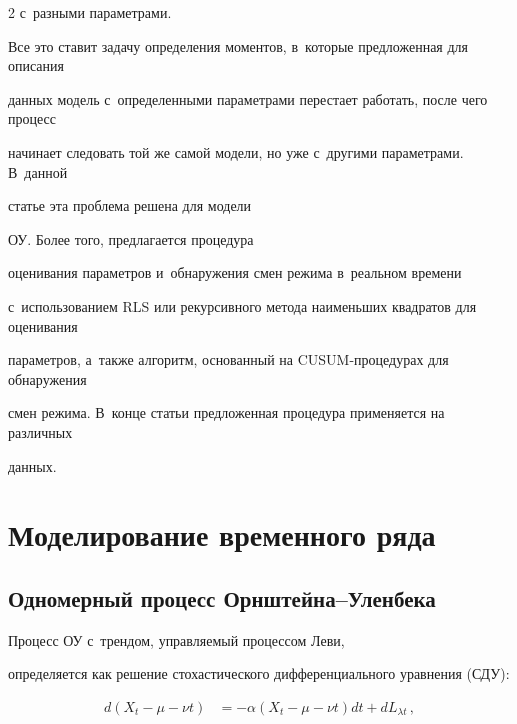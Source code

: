 \begin{multicols}{2}
с~разными параметрами.





Все это ставит задачу определения моментов, в~которые предложенная для описания 


данных модель с~определенными параметрами перестает работать, после чего процесс 


начинает следовать той же самой модели, но уже с~другими параметрами. В~данной 


статье эта проблема решена для модели\linebreak


 ОУ. Более того, предлагается процедура 


оценивания параметров  и~обнаружения смен режима в~реаль\-ном времени 


с~использованием RLS или рекурсивного метода наименьших квадратов для оценивания 


параметров, а~также алгоритм, основанный на CUSUM-про\-це\-ду\-рах для обнаружения 


смен режима. В~конце статьи предложенная процедура применяется на различных 


данных.








\section{Моделирование временного ряда}





        \subsection {Одномерный процесс Орнштейна--Уленбека}





       Процесс ОУ с~трендом, управляемый процессом Леви, 


определяется как решение стохастического дифференциального уравнения  (СДУ):       


\begin{align*}


d\left(X_t -\mu -  \nu t\right)& = -\alpha\left(X_t - \mu - \nu 


t\right) dt +  dL_{\lambda t}\,,\\ 



\end{align*}
\end{multicols}
